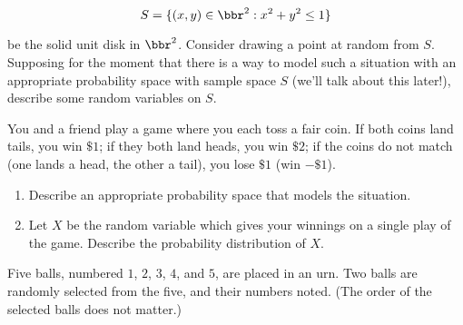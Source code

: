\documentclass[12pt,reqno]{amsart}
\begin{document}
    \[S = \{ (x,y) \in \bbr^2 : x^2+y^2 \leq 1\}\]

be the solid unit disk in $\bbr^2$. Consider drawing a point at random from $S$. Supposing for the moment that there is a way to model such a situation with an appropriate probability space with sample space $S$ (we'll talk about this later!), describe some random variables on $S$.\vfill

























\bigskip
\prob You and a friend play a game where you each toss a fair coin. If both coins land tails, you win $\$1$; if they both land heads, you win $\$2$; if the coins do not match (one lands a head, the other a tail), you lose $\$1$ (win $-\$1$).

\medskip
\begin{enumerate}
    \item Describe an appropriate probability space that models the situation.\vfill
    
    

    \item Let $X$ be the random variable which gives your winnings on a single play of the game. Describe the probability distribution of $X$.\vfill
    
    
\end{enumerate}























\newpage
\prob Five balls, numbered $1$, $2$, $3$, $4$, and $5$, are placed in an urn. Two balls are randomly selected from the five, and their numbers noted. (The order of the selected balls does not matter.)
\end{document}
